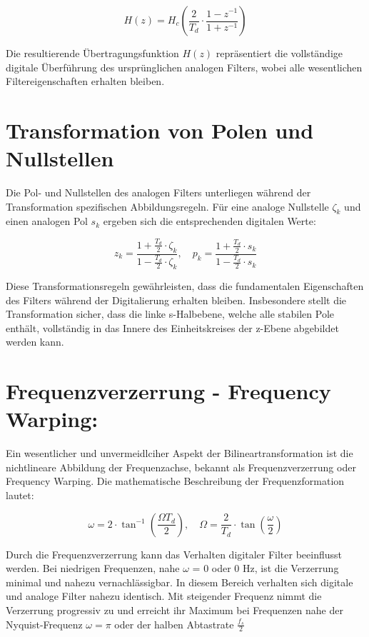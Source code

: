 \documentclass[
  ngerman,
  letterpaper,
  DIV=11]{scrreprt}
\begin{document}
\[
H(z) = H_c\left( \frac{2}{T_d} \cdot \frac{1 - z^{-1}}{1 + z^{-1}} \right)
\]

Die resultierende Übertragungsfunktion \(H(z)\) repräsentiert die
vollständige digitale Überführung des ursprünglichen analogen Filters,
wobei alle wesentlichen Filtereigenschaften erhalten bleiben.

\section{Transformation von Polen und
Nullstellen}\label{transformation-von-polen-und-nullstellen}

Die Pol- und Nullstellen des analogen Filters unterliegen während der
Transformation spezifischen Abbildungsregeln. Für eine analoge
Nullstelle \(\zeta_k\) und einen analogen Pol \(s_k\) ergeben sich die
entsprechenden digitalen Werte:

\[
z_k = \frac{1 + \frac{T_d}{2} \cdot \zeta_k}{1 - \frac{T_d}{2} \cdot \zeta_k}, \quad
p_k = \frac{1 + \frac{T_d}{2} \cdot s_k}{1 - \frac{T_d}{2} \cdot s_k}
\]

Diese Transformationsregeln gewährleisten, dass die fundamentalen
Eigenschaften des Filters während der Digitalierung erhalten bleiben.
Insbesondere stellt die Transformation sicher, dass die linke
s-Halbebene, welche alle stabilen Pole enthält, vollständig in das
Innere des Einheitskreises der z-Ebene abgebildet werden kann.

\section{Frequenzverzerrung - Frequency
Warping:}\label{frequenzverzerrung---frequency-warping}

Ein wesentlicher und unvermeidlciher Aspekt der Bilineartransformation
ist die nichtlineare Abbildung der Frequenzachse, bekannt als
Frequenzverzerrung oder Frequency Warping. Die mathematische
Beschreibung der Frequenzformation lautet:

\[
\omega = 2 \cdot \tan^{-1} \left( \frac{\Omega T_d}{2} \right), \quad
\Omega = \frac{2}{T_d} \cdot \tan\left( \frac{\omega}{2} \right)
\]

Durch die Frequenzverzerrung kann das Verhalten digitaler Filter
beeinflusst werden. Bei niedrigen Frequenzen, nahe \(\omega\) = 0 oder 0
Hz, ist die Verzerrung minimal und nahezu vernachlässigbar. In diesem
Bereich verhalten sich digitale und analoge Filter nahezu identisch. Mit
steigender Frequenz nimmt die Verzerrung progressiv zu und erreicht ihr
Maximum bei Frequenzen nahe der Nyquist-Frequenz \(\omega = \pi\) oder
der halben Abtastrate \(\frac{f_s}{2}\)
\end{document}
